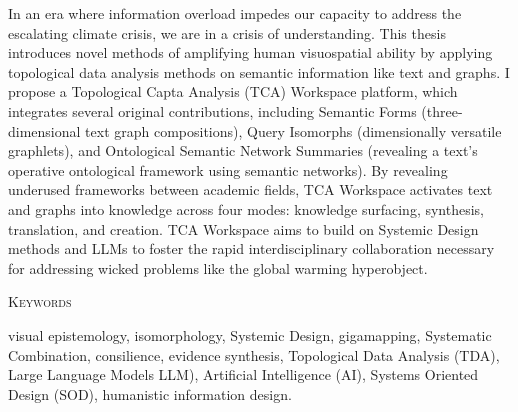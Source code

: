 In an era where information overload impedes our capacity to address the escalating climate crisis, we are in a crisis of understanding. This thesis introduces novel methods of amplifying human visuospatial ability by applying topological data analysis methods on semantic information like text and graphs. I propose a Topological Capta Analysis (TCA) Workspace platform, which integrates several original contributions, including Semantic Forms (three-dimensional text graph compositions), Query Isomorphs (dimensionally versatile graphlets), and Ontological Semantic Network Summaries (revealing a text's operative ontological framework using semantic networks). By revealing underused frameworks between academic fields, TCA Workspace activates text and graphs into knowledge across four modes: knowledge surfacing, synthesis, translation, and creation. TCA Workspace aims to build on Systemic Design methods and LLMs to foster the rapid interdisciplinary collaboration necessary for addressing wicked problems like the global warming hyperobject.

\vfill
  	\begin{center}
	\scshape Keywords \\ \rm
	\end{center}
visual epistemology, isomorphology, Systemic Design, gigamapping, Systematic Combination, consilience, evidence synthesis, Topological Data Analysis (TDA), Large Language Models LLM), Artificial Intelligence (AI), Systems Oriented Design (SOD), humanistic information design.